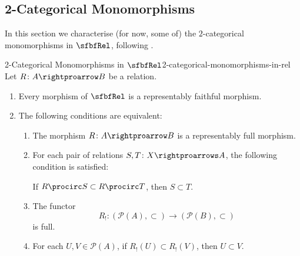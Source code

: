 \subsection{2-Categorical Monomorphisms}\label{subsection-2-categorical-monomorphisms-in-rel}
In this section we characterise (for now, some of) the $2$-categorical monomorphisms in $\sfbfRel$, following .
\begin{proposition}{2-Categorical Monomorphisms in $\sfbfRel$}{2-categorical-monomorphisms-in-rel}%
    Let $R\colon A\rightproarrow B$ be a relation.
    \begin{enumerate}
        \item\label{2-categorical-monomorphisms-in-rel-representably-faithful-morphisms-in-rel}Every morphism of $\sfbfRel$ is a representably faithful morphism.
        \item\label{2-categorical-monomorphisms-in-rel-representably-full-morphisms-in-rel}The following conditions are equivalent:
            \begin{enumerate}
                \item\label{2-categorical-monomorphisms-in-rel-representably-full-morphisms-in-rel-1}The morphism $R\colon A\rightproarrow B$ is a representably full morphism.
                \item\label{2-categorical-monomorphisms-in-rel-representably-full-morphisms-in-rel-2}For each pair of relations $S,T\colon X\rightproarrows A$, the following condition is satisfied:
                    \begin{itemize}
                        \itemstar If $R\procirc S\subset R\procirc T$, then $S\subset T$.
                    \end{itemize}
                \item\label{2-categorical-monomorphisms-in-rel-representably-full-morphisms-in-rel-3}The functor
                    \[
                        R_{!}%
                        \colon%
                        (\mathcal{P}(A),\subset)%
                        \to%
                        (\mathcal{P}(B),\subset)%
                    \]%
                    is full.
                \item\label{2-categorical-monomorphisms-in-rel-representably-full-morphisms-in-rel-4}For each $U,V\in\mathcal{P}(A)$, if $R_{!}(U)\subset R_{!}(V)$, then $U\subset V$.

\end{enumerate}
\end{enumerate}
\end{proposition}
